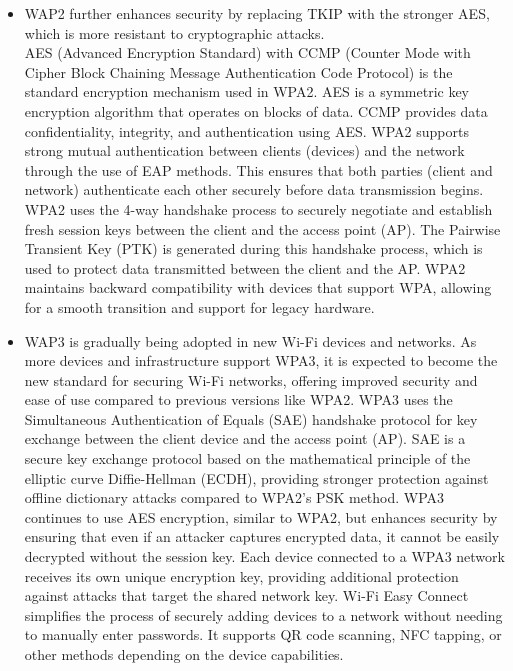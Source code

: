 \documentclass{article}
\begin{document}
\begin{itemize}
	\item[] WAP2 further enhances security by replacing TKIP with the stronger AES, which is more resistant to cryptographic attacks.\\
		AES (Advanced Encryption Standard) with CCMP (Counter Mode with Cipher Block Chaining Message Authentication Code Protocol) is the standard encryption mechanism used in WPA2. AES is a symmetric key encryption algorithm that operates on blocks of data. CCMP provides data confidentiality, integrity, and authentication using AES. WPA2 supports strong mutual authentication between clients (devices) and the network through the use of EAP methods. This ensures that both parties (client and network) authenticate each other securely before data transmission begins. WPA2 uses the 4-way handshake process to securely negotiate and establish fresh session keys between the client and the access point (AP). The Pairwise Transient Key (PTK) is generated during this handshake process, which is used to protect data transmitted between the client and the AP. WPA2 maintains backward compatibility with devices that support WPA, allowing for a smooth transition and support for legacy hardware.
	\item[] WAP3 is gradually being adopted in new Wi-Fi devices and networks. As more devices and infrastructure support WPA3, it is expected to become the new standard for securing Wi-Fi networks, offering improved security and ease of use compared to previous versions like WPA2.
		WPA3 uses the Simultaneous Authentication of Equals (SAE) handshake protocol for key exchange between the client device and the access point (AP). SAE is a secure key exchange protocol based on the mathematical principle of the elliptic curve Diffie-Hellman (ECDH), providing stronger protection against offline dictionary attacks compared to WPA2's PSK method. WPA3 continues to use AES encryption, similar to WPA2, but enhances security by ensuring that even if an attacker captures encrypted data, it cannot be easily decrypted without the session key. Each device connected to a WPA3 network receives its own unique encryption key, providing additional protection against attacks that target the shared network key. Wi-Fi Easy Connect simplifies the process of securely adding devices to a network without needing to manually enter passwords. It supports QR code scanning, NFC tapping, or other methods depending on the device capabilities.
	

\end{itemize}
\end{document}
